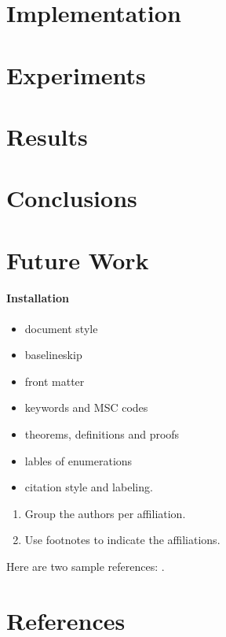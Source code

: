 \documentclass[review]{elsarticle}
\begin{document}
\section{Implementation}
\label{section:implementation}

\section{Experiments}
\label{section:experiments}

\section{Results}
\label{section:results}

\section{Conclusions}
\label{section:conclusions}

\section{Future Work}
\label{section:future-work}


\paragraph{Installation}

\begin{itemize}
\item document style
\item baselineskip
\item front matter
\item keywords and MSC codes
\item theorems, definitions and proofs
\item lables of enumerations
\item citation style and labeling.
\end{itemize}

\begin{enumerate}[(1)]
\item Group the authors per affiliation.
\item Use footnotes to indicate the affiliations.
\end{enumerate}

Here are two sample references: \cite{Feynman1963118,Dirac1953888}.

\section*{References}


\end{document}
